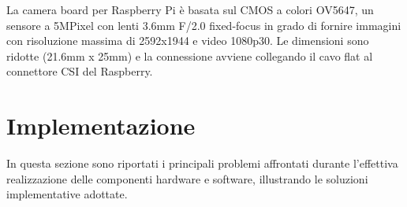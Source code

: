 \documentclass[12pt]{article}
\begin{document}
La camera board per Raspberry Pi è basata sul CMOS a colori OV5647, un sensore a 5MPixel con lenti 3.6mm F/2.0 fixed-focus in grado di fornire immagini con risoluzione massima di 2592x1944 e video 1080p30. Le dimensioni sono ridotte (21.6mm x 25mm) e la connessione avviene collegando il cavo flat al connettore CSI del Raspberry.

\newpage



\section{Implementazione}\label{sec:implementazione}

In questa sezione sono riportati i principali problemi affrontati durante l'effettiva realizzazione delle componenti hardware e software, illustrando le soluzioni implementative adottate.
\end{document}
